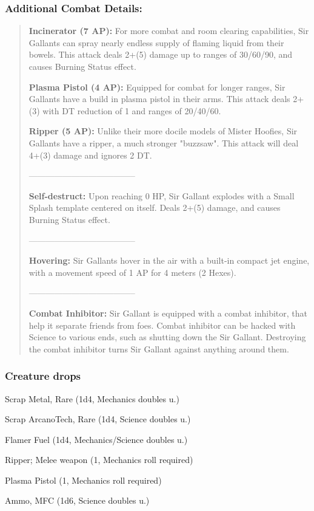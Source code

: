 \documentclass[11pt,a4paper,twocolumn]{book}
\begin{document}
	\subsubsection*{Additional Combat Details:}
	\begin{verse}
		\textbf{Incinerator (7 AP):} For more combat and room clearing capabilities, Sir Gallants can spray nearly endless supply of flaming liquid from their bowels. This attack deals 2+(5) damage up to ranges of 30/60/90, and causes Burning Status effect.
		
		\textbf{Plasma Pistol (4 AP):} Equipped for combat for longer ranges, Sir Gallants have a build in plasma pistol in their arms. This attack deals 2+(3) with DT reduction of 1 and ranges of 20/40/60.
		
		\textbf{Ripper (5 AP):} Unlike their more docile models of Mister Hoofies, Sir Gallants have a ripper, a much stronger "buzzsaw". This attack will deal 4+(3) damage and ignores 2 DT.
		
		--------------------------------------
		
		\textbf{Self-destruct:} Upon reaching 0 HP, Sir Gallant explodes with a Small Splash template centered on itself. Deals 2+(5) damage, and causes Burning Status effect. 
		
	--------------------------------------	
		
		\textbf{Hovering:} Sir Gallants hover in the air with a built-in compact jet engine, with a movement speed of 1 AP for 4 meters (2 Hexes).
		
	--------------------------------------	
		
		\textbf{Combat Inhibitor:} Sir Gallant is equipped with a combat inhibitor, that help it separate friends from foes. Combat inhibitor can be hacked with Science to various ends, such as shutting down the Sir Gallant. Destroying the combat inhibitor turns Sir Gallant against anything around them. 
		
%		
%		
	\end{verse}
	
	\subsubsection*{Creature drops}
	\begin{compactitem}
		\item Scrap Metal, Rare (1d4, Mechanics doubles u.)
		\item Scrap ArcanoTech, Rare (1d4, Science doubles u.)
		\item Flamer Fuel (1d4, Mechanics/Science doubles u.)
		\item Ripper; Melee weapon (1, Mechanics roll required)
		\item Plasma Pistol (1, Mechanics roll required)
		\item Ammo, MFC (1d6, Science doubles u.)
	\end{compactitem}
	
\end{document}
